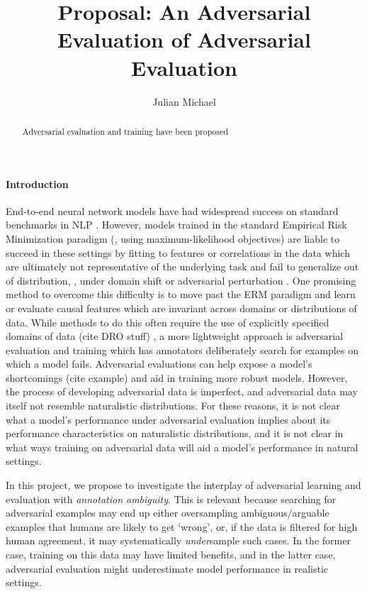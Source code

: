 \documentclass[10pt,a4paper]{article}
\title{Proposal: An Adversarial Evaluation of Adversarial Evaluation}
\author{Julian Michael}
\affil[ ]{CSE 599: Empirical Foundations of Machine Learning}
\affil[ ]{Paul G. Allen School of Computer Science \& Engineering, University of Washington}
\affil[ ]{\texttt{julianjm@cs.washington.edu}}
\date{}
\begin{document}
\maketitle

\begin{abstract}
  Adversarial evaluation and training have been proposed
\end{abstract}

\paragraph{Introduction}
End-to-end neural network models have had widespread success on standard benchmarks in NLP
\citep{wang-etal-2019-glue,wang-etal-2019-superglue,lee-etal-2018-end}.
However, models trained in the standard Empirical Risk Minimization paradigm (\eg, using
maximum-likelihood objectives) are liable to succeed in these settings by fitting to features or
correlations in the data which are ultimately not representative of the underlying task and fail to
generalize out of distribution, \eg, under domain shift or adversarial perturbation
\citep{gururangan-etal-2018-annotation,ilyas-etal-2019-adversarial}.
One promising method to overcome this difficulty is to move past the ERM paradigm and learn or
evaluate causal features which are invariant across domains or distributions of data.
While methods to do this often require the use of explicitly specified domains of data (cite DRO
stuff) \citep{peters-etal-2016-causal,arjovsky-etal-2020-invariant},
a more lightweight approach is adversarial evaluation and training
\citep{nie-etal-2020-adversarial,kiela-etal-2021-dynabench} which has annotators deliberately search
for examples on which a model fails.
Adversarial evaluations can help expose a model's shortcomings (cite example) and aid in training
more robust models.
However, the process of developing adversarial data is imperfect, and adversarial data may itself
not resemble naturalistic distributions.
For these reasons, it is not clear what a model's performance under adversarial evaluation implies
about its performance characteristics on naturalistic distributions,
and it is not clear in what ways training on adversarial data will aid a model's performance in
natural settings.

In this project, we propose to investigate the interplay of adversarial learning and evaluation with
\textit{annotation ambiguity}.
This is relevant because searching for adversarial examples may end up either oversampling
ambiguous/arguable examples that humans are likely to get `wrong', or, if the data is filtered for
high human agreement, it may systematically \textit{under}sample such cases.
In the former case, training on this data may have limited benefits, and in the latter case,
adversarial evaluation might underestimate model performance in realistic settings.
\end{document}
